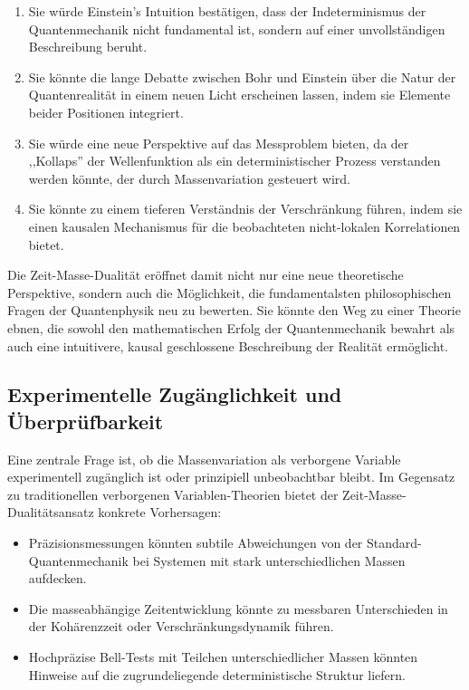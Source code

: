 \documentclass[12pt,a4paper]{article}  %
\begin{document}
	\begin{enumerate}
		\item Sie würde Einstein's Intuition bestätigen, dass der Indeterminismus der Quantenmechanik nicht fundamental ist, sondern auf einer unvollständigen Beschreibung beruht.
		
		\item Sie könnte die lange Debatte zwischen Bohr und Einstein über die Natur der Quantenrealität in einem neuen Licht erscheinen lassen, indem sie Elemente beider Positionen integriert.

		\item Sie würde eine neue Perspektive auf das Messproblem bieten, da der ,,Kollaps'' der Wellenfunktion als ein deterministischer Prozess verstanden werden könnte, der durch Massenvariation gesteuert wird.
		
		\item Sie könnte zu einem tieferen Verständnis der Verschränkung führen, indem sie einen kausalen Mechanismus für die beobachteten nicht-lokalen Korrelationen bietet.
		\end{enumerate}
		
		Die Zeit-Masse-Dualität eröffnet damit nicht nur eine neue theoretische Perspektive, sondern auch die Möglichkeit, die fundamentalsten philosophischen Fragen der Quantenphysik neu zu bewerten. Sie könnte den Weg zu einer Theorie ebnen, die sowohl den mathematischen Erfolg der Quantenmechanik bewahrt als auch eine intuitivere, kausal geschlossene Beschreibung der Realität ermöglicht.
		
		\subsection{Experimentelle Zugänglichkeit und Überprüfbarkeit}
		
		Eine zentrale Frage ist, ob die Massenvariation als verborgene Variable experimentell zugänglich ist oder prinzipiell unbeobachtbar bleibt. Im Gegensatz zu traditionellen verborgenen Variablen-Theorien bietet der Zeit-Masse-Dualitätsansatz konkrete Vorhersagen:
		
		\begin{itemize}
		\item Präzisionsmessungen könnten subtile Abweichungen von der Standard-Quantenmechanik bei Systemen mit stark unterschiedlichen Massen aufdecken.
		
		\item Die masseabhängige Zeitentwicklung könnte zu messbaren Unterschieden in der Kohärenzzeit oder Verschränkungsdynamik führen.
		
		\item Hochpräzise Bell-Tests mit Teilchen unterschiedlicher Massen könnten Hinweise auf die zugrundeliegende deterministische Struktur liefern.
		\end{itemize}
		
\end{document}
